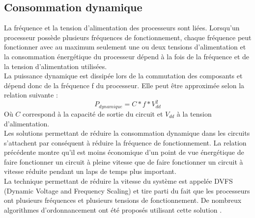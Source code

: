 \subsection{Consommation dynamique}
\vspace{-1cm}
La fréquence et la tension d’alimentation des processeurs sont liées. Lorsqu’un processeur possède plusieurs fréquences de fonctionnement, chaque fréquence peut fonctionner avec au maximum seulement une ou deux tensions d’alimentation et la consommation énergétique du processeur dépend à la fois de la fréquence et de la tension d’alimentation utilisées.
\\ \indent La puissance dynamique est dissipée lors de la commutation des composants et dépend donc de la fréquence f du processeur. Elle peut être approximée selon la relation suivante \cite{CK07} : 
\begin{equation}
P_{dynamique} = C * f * V_{dd}^2 
\end{equation}
Où $C$ correspond à la capacité de sortie du circuit et $V_{dd}$ à la tension d’alimentation. 	
\\ \indent Les solutions permettant de réduire la consommation dynamique dans les circuits s’attachent par conséquent à réduire la fréquence de fonctionnement. La relation précédente montre qu’il est moins économique d’un point de vue énergétique de faire fonctionner un circuit à pleine vitesse que de faire fonctionner un circuit à vitesse réduite pendant un laps de temps plus important.
\\ \indent La technique permettant de réduire la vitesse du système est appelée DVFS (Dynamic Voltage and Frequency Scaling) et tire parti du fait que les processeurs ont plusieurs fréquences et plusieurs tensions de fonctionnement. De nombreux algorithmes d’ordonnancement ont été proposés utilisant cette solution \cite{WWDS94, YDS95, PS01}.
